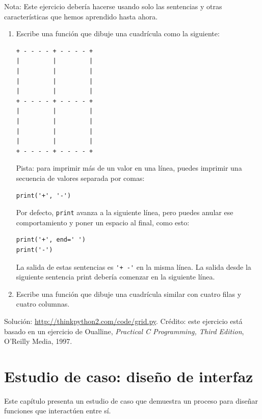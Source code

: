 \documentclass[10pt]{book}
\begin{document}
\begin{exercise}

Nota: Este ejercicio debería hacerse
usando solo las sentencias y otras características que hemos aprendido hasta
ahora.

\begin{enumerate}

\item Escribe una función que dibuje una cuadrícula como la siguiente:
\newpage
\begin{verbatim}
+ - - - - + - - - - +
|         |         |
|         |         |
|         |         |
|         |         |
+ - - - - + - - - - +
|         |         |
|         |         |
|         |         |
|         |         |
+ - - - - + - - - - +
\end{verbatim}
%
Pista: para imprimir más de un valor en una línea, puedes imprimir
una secuencia de valores separada por comas:

\begin{verbatim}
print('+', '-')
\end{verbatim}
%
Por defecto, {\tt print} avanza a la siguiente línea, pero
puedes anular ese comportamiento y poner un espacio al final, como esto:

\begin{verbatim}
print('+', end=' ')
print('-')
\end{verbatim}
%
La salida de estas sentencias es \verb"'+ -'" en la misma línea.
La salida desde la siguiente sentencia print debería comenzar en la siguiente línea.

\item Escribe una función que dibuje una cuadrícula similar
con cuatro filas y cuatro columnas.

\end{enumerate}

Solución: \url{http://thinkpython2.com/code/grid.py}.
Crédito: este ejercicio está basado en un ejercicio de Oualline, {\em
    Practical C Programming, Third Edition}, O'Reilly Media, 1997.

\end{exercise}





\chapter{Estudio de caso: diseño de interfaz}
\label{turtlechap}

Este capítulo presenta un estudio de caso que demuestra un proceso para
diseñar funciones que interactúen entre sí.
\end{document}

